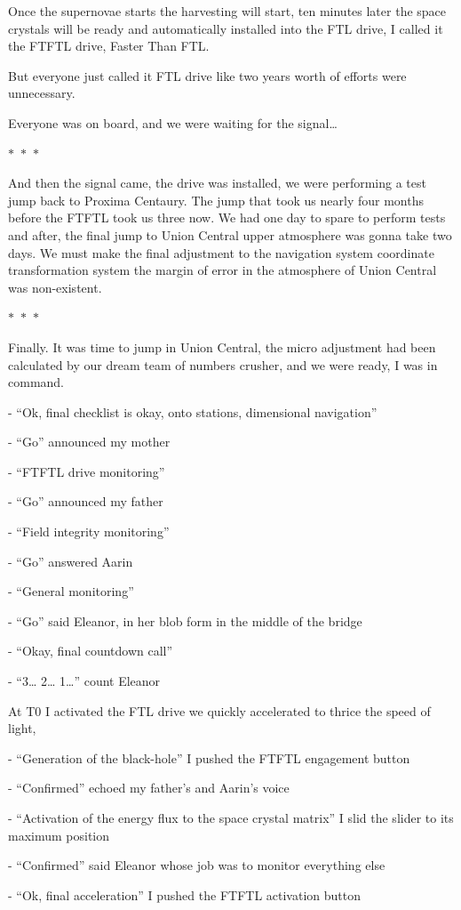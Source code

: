 \documentclass[colorlinks,12pt,a4paper]{book}
\newcommand\sep{\begin{center}
  \boldmath $\ast$~$\ast$~$\ast$
\end{center}}
\begin{document}
 Once the supernovae starts the harvesting will start, ten minutes later the space crystals will be ready and automatically
  installed into the FTL drive, I called it the FTFTL drive, Faster Than FTL.\par
  \bigskip
 But everyone just called it FTL drive like two years worth of efforts were unnecessary. \par
 \bigskip
 
 Everyone was on board, and we were waiting for the signal…
 
 \sep
 
 And then the signal came, the drive was installed, we were performing a test jump back to Proxima Centaury. The jump that
  took us nearly four months before the FTFTL took us three now. We had one day to spare to perform tests and after, 
  the final jump to Union Central upper atmosphere was gonna take two days. We must make the final adjustment to the 
  navigation system coordinate transformation system the margin of error in the atmosphere of Union Central was non-existent.
 
  \sep
 
 Finally. It was time to jump in Union Central, the micro adjustment had been calculated by our dream team of numbers 
 crusher, and we were ready, I was in command.\par
 \bigskip
 
 - “Ok, final checklist is okay, onto stations, dimensional navigation”\par
 \bigskip
 - “Go” announced my mother\par
 \bigskip
 - “FTFTL drive monitoring”\par
 \bigskip
 - “Go” announced my father\par
 \bigskip
 - “Field integrity monitoring”\par
 \bigskip
 - “Go” answered Aarin\par
 \bigskip
 - “General monitoring”\par
 \bigskip
 - “Go” said Eleanor, in her blob form in the middle of the bridge\par
 \bigskip
 
 - “Okay, final countdown call”\par
 \bigskip
 - “3… 2… 1…” count Eleanor\par
 \bigskip
 
 At T0 I activated the FTL drive we quickly accelerated to thrice the speed of light, \par
 \bigskip
 - “Generation of the black-hole” I pushed the FTFTL engagement button\par
 \bigskip
 - “Confirmed” echoed my father's and Aarin's voice\par
 \bigskip
 - “Activation of the energy flux to the space crystal matrix” I slid the slider to its maximum position\par
 \bigskip
 - “Confirmed” said Eleanor whose job was to monitor everything else\par
 \bigskip
 - “Ok, final acceleration” I pushed the FTFTL activation button\par
 \bigskip
 
\end{document}
